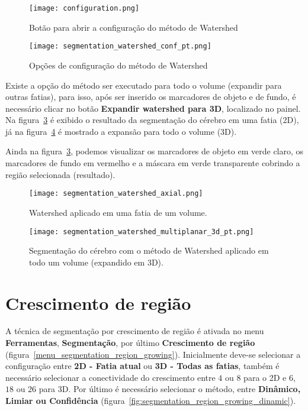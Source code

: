 \begin{figure}[!htb]
\centering
\texttt{[image: configuration.png]}
\caption{Botão para abrir a configuração do método de Watershed}
\label{fig:watershed_conf}
\end{figure}

\begin{figure}[!htb]
\centering
\texttt{[image: segmentation\_watershed\_conf\_pt.png]}
\caption{Opções de configuração do método de Watershed}
\label{fig:watershed_janela_conf}
\end{figure}

Existe a opção do método ser executado para todo o volume (expandir para outras fatias), para isso, após ser inserido os marcadores de objeto e de fundo, é necessário clicar no botão \textbf{Expandir watershed para 3D}, localizado no painel. Na figura~\ref{fig:watershed_2d} é exibido o resultado da segmentação do cérebro em uma fatia (2D), já na figura~\ref{fig:watershed_3d} é mostrado a expansão para todo o volume (3D). 

Ainda na figura~\ref{fig:watershed_2d}, podemos visualizar os marcadores de objeto em verde claro, os marcadores de fundo em vermelho e a máscara em verde transparente cobrindo a região selecionada (resultado).

\begin{figure}[!htb]
\centering
\texttt{[image: segmentation\_watershed\_axial.png]}
\caption{Watershed aplicado em uma fatia de um volume.}
\label{fig:watershed_2d}
\end{figure}

\begin{figure}[!htb]
\centering
\texttt{[image: segmentation\_watershed\_multiplanar\_3d\_pt.png]}
\caption{Segmentação do cérebro com o método de Watershed aplicado em todo um volume (expandido em 3D).}
\label{fig:watershed_3d}
\end{figure}

\section{Crescimento de região}

A técnica de segmentação por crescimento de região é ativada no menu \textbf{Ferramentas}, \textbf{Segmentação}, por último \textbf{Crescimento de região} (figura~\ref{menu_segmentation_region_growing}). Inicialmente deve-se selecionar a configuração entre \textbf{2D - Fatia atual} ou \textbf{3D - Todas as fatias}, também é necessário selecionar a conectividade do crescimento entre $4$ ou $8$ para o 2D e $6$, $18$ ou $26$ para 3D. Por último é necessário selecionar o método, entre \textbf{Dinâmico, Limiar ou Confidência} (figura~\ref{fig:segmentation_region_growing_dinamic}).

